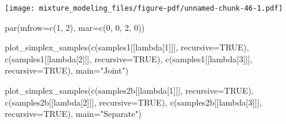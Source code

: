 \documentclass[
  letterpaper,
  DIV=11,
  numbers=noendperiod]{scrartcl}
\newenvironment{Shaded}{\begin{snugshade}}{\end{snugshade}}
\newcommand{\AttributeTok}[1]{\textcolor[rgb]{0.40,0.45,0.13}{#1}}
\newcommand{\ConstantTok}[1]{\textcolor[rgb]{0.56,0.35,0.01}{#1}}
\newcommand{\DecValTok}[1]{\textcolor[rgb]{0.68,0.00,0.00}{#1}}
\newcommand{\FloatTok}[1]{\textcolor[rgb]{0.68,0.00,0.00}{#1}}
\newcommand{\FunctionTok}[1]{\textcolor[rgb]{0.28,0.35,0.67}{#1}}
\newcommand{\NormalTok}[1]{\textcolor[rgb]{0.00,0.23,0.31}{#1}}
\newcommand{\SpecialCharTok}[1]{\textcolor[rgb]{0.37,0.37,0.37}{#1}}
\newcommand{\StringTok}[1]{\textcolor[rgb]{0.13,0.47,0.30}{#1}}
\begin{document}
\begin{Shaded}
\end{Shaded}

\texttt{[image: mixture\_modeling\_files/figure-pdf/unnamed-chunk-46-1.pdf]}

\begin{Shaded}
\begin{Highlighting}[]
\FunctionTok{par}\NormalTok{(}\AttributeTok{mfrow=}\FunctionTok{c}\NormalTok{(}\DecValTok{1}\NormalTok{, }\DecValTok{2}\NormalTok{), }\AttributeTok{mar=}\FunctionTok{c}\NormalTok{(}\DecValTok{0}\NormalTok{, }\DecValTok{0}\NormalTok{, }\DecValTok{2}\NormalTok{, }\DecValTok{0}\NormalTok{))}

\FunctionTok{plot\_simplex\_samples}\NormalTok{(}\FunctionTok{c}\NormalTok{(samples1[[}\StringTok{\textquotesingle{}lambda[1]\textquotesingle{}}\NormalTok{]], }\AttributeTok{recursive=}\ConstantTok{TRUE}\NormalTok{),}
                     \FunctionTok{c}\NormalTok{(samples1[[}\StringTok{\textquotesingle{}lambda[2]\textquotesingle{}}\NormalTok{]], }\AttributeTok{recursive=}\ConstantTok{TRUE}\NormalTok{),}
                     \FunctionTok{c}\NormalTok{(samples1[[}\StringTok{\textquotesingle{}lambda[3]\textquotesingle{}}\NormalTok{]], }\AttributeTok{recursive=}\ConstantTok{TRUE}\NormalTok{),}
                     \AttributeTok{main=}\StringTok{"Joint"}\NormalTok{)}

\FunctionTok{plot\_simplex\_samples}\NormalTok{(}\FunctionTok{c}\NormalTok{(samples2b[[}\StringTok{\textquotesingle{}lambda[1]\textquotesingle{}}\NormalTok{]], }\AttributeTok{recursive=}\ConstantTok{TRUE}\NormalTok{),}
                     \FunctionTok{c}\NormalTok{(samples2b[[}\StringTok{\textquotesingle{}lambda[2]\textquotesingle{}}\NormalTok{]], }\AttributeTok{recursive=}\ConstantTok{TRUE}\NormalTok{),}
                     \FunctionTok{c}\NormalTok{(samples2b[[}\StringTok{\textquotesingle{}lambda[3]\textquotesingle{}}\NormalTok{]], }\AttributeTok{recursive=}\ConstantTok{TRUE}\NormalTok{),}
                     \AttributeTok{main=}\StringTok{"Separate"}\NormalTok{)}
\end{Highlighting}
\end{Shaded}
\end{document}
